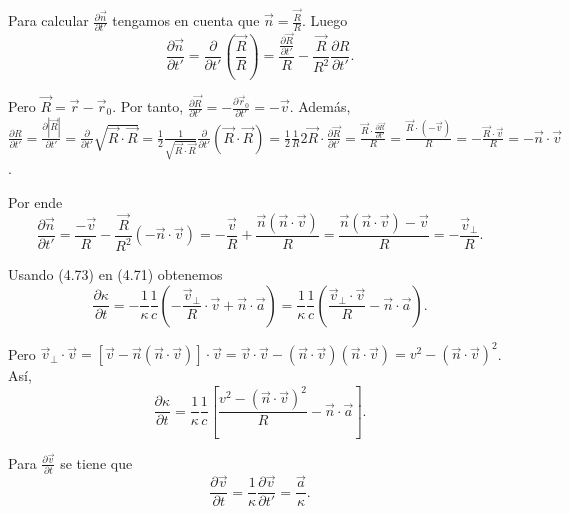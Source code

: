 \documentclass[12pt,a4paper]{book}
\begin{document}
Para calcular $\frac{\partial\vec{n}}{\partial t'}$ tengamos en cuenta que $\vec{n} = \frac{\vec{R}}{R}$. Luego
\begin{equation}
\frac{\partial\vec{n}}{\partial t'} = \frac{\partial}{\partial t'}\left(\frac{\vec{R}}{R}\right) = \frac{\frac{\partial\vec{R}}{\partial t'}}{R} - \frac{\vec{R}}{R^2}\frac{\partial R}{\partial t'}.
\end{equation}

Pero $\vec{R} = \vec{r} - \vec{r}_0$. Por tanto, $\frac{\partial\vec{R}}{\partial t'} = -\frac{\partial\vec{r}_0}{\partial t'} = -\vec{v}$. Además, $\frac{\partial R}{\partial t'} = \frac{\partial|\vec{R}|}{\partial t'} = \frac{\partial}{\partial t'}\sqrt{\vec{R} \cdot \vec{R}} = \frac{1}{2}\frac{1}{\sqrt{\vec{R} \cdot \vec{R}}}\frac{\partial}{\partial t'}(\vec{R} \cdot \vec{R}) = \frac{1}{2}\frac{1}{R}2\vec{R} \cdot \frac{\partial\vec{R}}{\partial t'} = \frac{\vec{R} \cdot \frac{\partial\vec{R}}{\partial t'}}{R} = \frac{\vec{R} \cdot (-\vec{v})}{R} = -\frac{\vec{R} \cdot \vec{v}}{R} = -\vec{n} \cdot \vec{v}$.

Por ende
\begin{equation}
\frac{\partial\vec{n}}{\partial t'} = \frac{-\vec{v}}{R} - \frac{\vec{R}}{R^2}(-\vec{n} \cdot \vec{v}) = -\frac{\vec{v}}{R} + \frac{\vec{n}(\vec{n} \cdot \vec{v})}{R} = \frac{\vec{n}(\vec{n} \cdot \vec{v}) - \vec{v}}{R} = -\frac{\vec{v}_{\perp}}{R}.
\end{equation}

Usando (4.73) en (4.71) obtenemos
\begin{equation}
\frac{\partial\kappa}{\partial t} = -\frac{1}{\kappa}\frac{1}{c}\left(-\frac{\vec{v}_{\perp}}{R} \cdot \vec{v} + \vec{n} \cdot \vec{a}\right) = \frac{1}{\kappa}\frac{1}{c}\left(\frac{\vec{v}_{\perp} \cdot \vec{v}}{R} - \vec{n} \cdot \vec{a}\right).
\end{equation}

Pero $\vec{v}_{\perp} \cdot \vec{v} = [\vec{v} - \vec{n}(\vec{n} \cdot \vec{v})] \cdot \vec{v} = \vec{v} \cdot \vec{v} - (\vec{n} \cdot \vec{v})(\vec{n} \cdot \vec{v}) = v^2 - (\vec{n} \cdot \vec{v})^2$. Así,
\begin{equation}
\frac{\partial\kappa}{\partial t} = \frac{1}{\kappa}\frac{1}{c}\left[\frac{v^2 - (\vec{n} \cdot \vec{v})^2}{R} - \vec{n} \cdot \vec{a}\right].
\end{equation}

Para $\frac{\partial\vec{v}}{\partial t}$ se tiene que
\begin{equation}
\frac{\partial\vec{v}}{\partial t} = \frac{1}{\kappa}\frac{\partial\vec{v}}{\partial t'} = \frac{\vec{a}}{\kappa}.
\end{equation}
\end{document}
